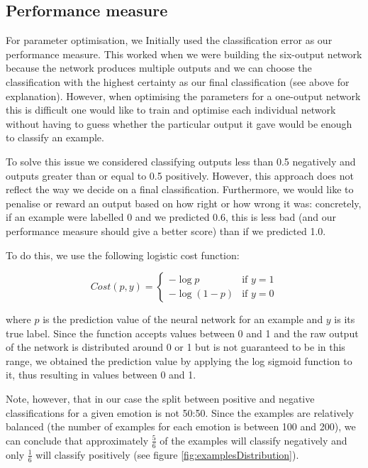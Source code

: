 \documentclass[10pt,a4paper]{article}
\begin{document}
\subsection{Performance measure}
For parameter optimisation, we Initially used the classification error as our performance measure. This worked when we were building the six-output network because the network produces multiple outputs and we can choose the classification with the highest certainty as our final classification (see above for explanation). However, when optimising the parameters for a one-output network this is difficult one would like to train and optimise each individual network without having to guess whether the particular output it gave would be enough to classify an example. 

To solve this issue we considered classifying outputs less than 0.5 negatively and outputs greater than or equal to 0.5 positively. However, this approach does not reflect the way we decide on a final classification. Furthermore, we would like to penalise or reward an output based on how right or how wrong it was: concretely, if an example were labelled 0 and we predicted 0.6, this is less bad (and our performance measure should give a better score) than if we predicted 1.0. 

To do this, we use the following logistic cost function:

\[
    Cost(p, y)= 
\begin{cases}
    -\log{p}& \text{if } y = 1\\
    -\log{(1 - p)}              & \text{if } y = 0
\end{cases}
\]

where $p$ is the prediction value of the neural network for an example and $y$ is its true label. Since the function accepts values between 0 and 1 and the raw output of the network is distributed around 0 or 1 but is not guaranteed to be in this range, we obtained the prediction value by applying the log sigmoid function to it, thus resulting in values between 0 and 1. 

Note, however, that in our case the split between positive and negative classifications for a given emotion is not 50:50. Since the examples are relatively balanced (the number of examples for each emotion is between 100 and 200), we can conclude that approximately $\frac{5}{6}$ of the examples will classify negatively and only $\frac{1}{6}$ will classify positively (see figure \ref{fig:examplesDistribution}).
\end{document}
